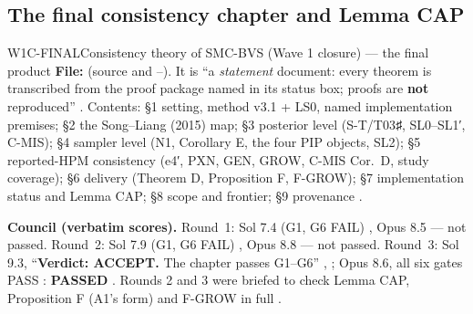 \subsection{The final consistency chapter and Lemma CAP}\label{sec:loop:final}
\begin{card}{W1C-FINAL}{Consistency theory of SMC-BVS (Wave 1 closure) — the final product}
\textbf{File:}  (source  and --). It is ``a \emph{statement} document: every theorem is transcribed from the proof package named in its status box; proofs are \textbf{not} reproduced'' . Contents: §1 setting, method v3.1 + LS0, named implementation premises; §2 the Song--Liang (2015) map; §3 posterior level (S-T/T03♯, SL0--SL1′, C-MIS); §4 sampler level (N1, Corollary E, the four PIP objects, SL2); §5 reported-HPM consistency (e4′, PXN, GEN, GROW, C-MIS Cor.~D, study coverage); §6 delivery (Theorem D, Proposition F, F-GROW); §7 implementation status and Lemma CAP; §8 scope and frontier; §9 provenance .

\textbf{Council (verbatim scores).} Round~1: Sol 7.4 (G1, G6 FAIL) , Opus 8.5  — not passed. Round~2: Sol 7.9 (G1, G6 FAIL) , Opus 8.8  — not passed. Round~3: Sol 9.3, ``\textbf{Verdict: ACCEPT.} The chapter passes G1–G6'' , ; Opus 8.6, all six gates PASS : \textbf{PASSED} . Rounds 2 and 3 were briefed to check Lemma CAP, Proposition F (A1's form) and F-GROW in full .


\end{card}
